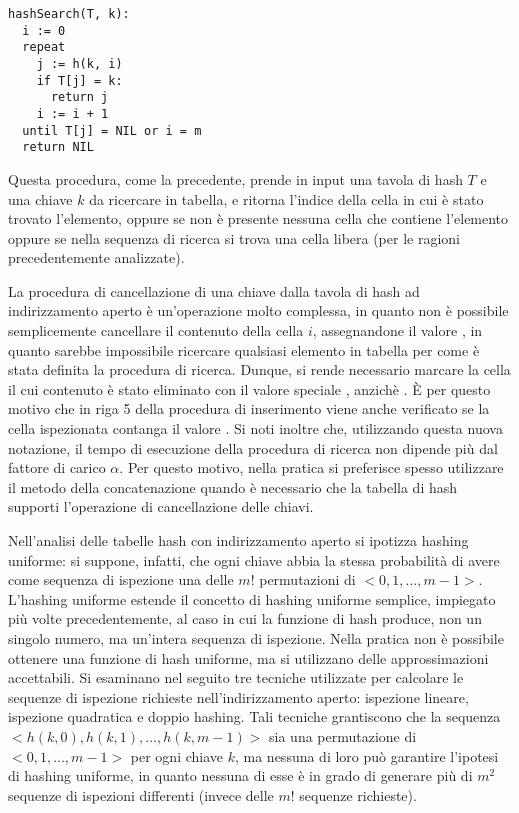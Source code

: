 \begin{lstlisting}
hashSearch(T, k):
  i := 0
  repeat
    j := h(k, i)
    if T[j] = k:
      return j
    i := i + 1
  until T[j] = NIL or i = m
  return NIL
\end{lstlisting}

Questa procedura, come la precedente, prende in input una tavola di hash \(T\) e una chiave \(k\) da ricercare in tabella, e ritorna l'indice della cella in cui è stato trovato l'elemento, oppure  se non è presente nessuna cella che contiene l'elemento oppure se nella sequenza di ricerca si trova una cella libera (per le ragioni precedentemente analizzate).

\vspace{10pt}

La procedura di cancellazione di una chiave dalla tavola di hash ad indirizzamento aperto è un'operazione molto complessa, in quanto non è possibile semplicemente cancellare il contenuto della cella \(i\), assegnandone il valore , in quanto sarebbe impossibile ricercare qualsiasi elemento in tabella per come è stata definita la procedura di ricerca. Dunque, si rende necessario marcare la cella il cui contenuto è stato eliminato con il valore speciale , anzichè . È per questo motivo che in riga 5 della procedura di inserimento viene anche verificato se la cella ispezionata contanga il valore . Si noti inoltre che, utilizzando questa nuova notazione, il tempo di esecuzione della procedura di ricerca non dipende più dal fattore di carico \(\alpha\). Per questo motivo, nella pratica si preferisce spesso utilizzare il metodo della concatenazione quando è necessario che la tabella di hash supporti l'operazione di cancellazione delle chiavi. 

\vspace{10pt}

Nell'analisi delle tabelle hash con indirizzamento aperto si ipotizza hashing uniforme: si suppone, infatti, che ogni chiave abbia la stessa probabilità di avere come sequenza di ispezione una delle \(m!\) permutazioni di \(<0,1,...,m-1>\). L'hashing uniforme estende il concetto di hashing uniforme semplice, impiegato più volte precedentemente, al caso in cui la funzione di hash produce, non un singolo numero, ma un'intera sequenza di ispezione. Nella pratica non è possibile ottenere una funzione di hash uniforme, ma si utilizzano delle approssimazioni accettabili. Si esaminano nel seguito tre tecniche utilizzate per calcolare le sequenze di ispezione richieste nell'indirizzamento aperto: ispezione lineare, ispezione quadratica e doppio hashing. Tali tecniche grantiscono che la sequenza \(<h(k,0), h(k,1),..., h(k,m-1)>\) sia una permutazione di \(<0,1,...,m-1>\) per ogni chiave \(k\), ma nessuna di loro può garantire l'ipotesi di hashing uniforme, in quanto nessuna di esse è in grado di generare più di \(m^2\) sequenze di ispezioni differenti (invece delle \(m!\) sequenze richieste). 

